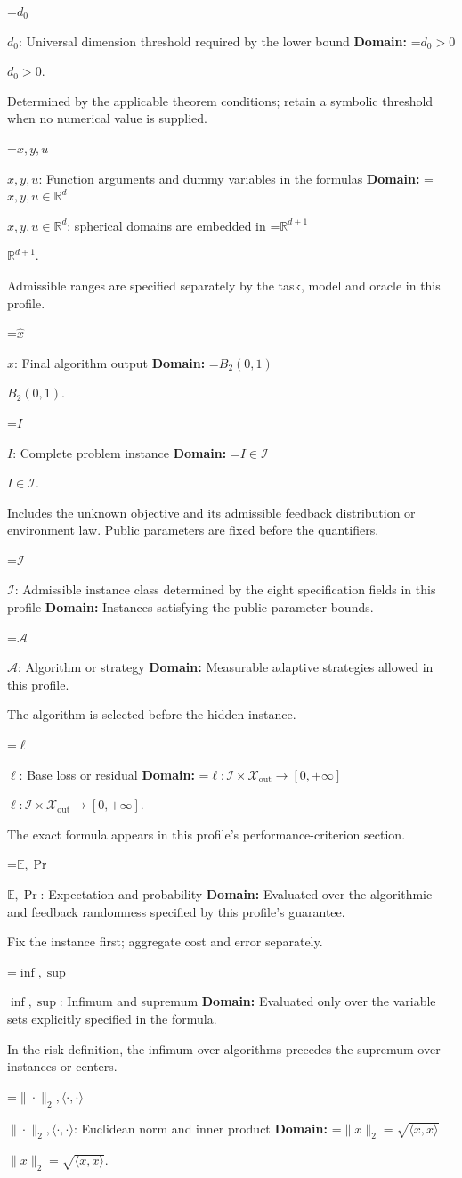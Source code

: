 \documentclass[10pt,a4paper]{article}
\newcommand{\AtlasMath}[1]{\par\begingroup\centering\setbox0=\hbox{$\displaystyle #1$}\ifdim\wd0>1.4\linewidth\typeout{ATLAS WIDE FORMULA: \the\wd0}\fi\ifdim\wd0>\linewidth\resizebox{\linewidth}{!}{\box0}\else\box0\fi\par\endgroup}
\newcommand{\AtlasInlineMath}[1]{\begingroup\setbox0=\hbox{$#1$}\ifdim\wd0>.4\linewidth\endgroup\AtlasMath{#1}\else\endgroup$#1$\fi}
\begin{document}
\AtlasInlineMath{d_0}: Universal dimension threshold required by the lower bound \textbf{Domain:} \AtlasInlineMath{d_0>0}.

Determined by the applicable theorem conditions; retain a symbolic threshold when no numerical value is supplied.

\AtlasInlineMath{x,y,u}: Function arguments and dummy variables in the formulas \textbf{Domain:} \AtlasInlineMath{x,y,u\in\mathbb{R}^d}; spherical domains are embedded in \AtlasInlineMath{\mathbb{R}^{d+1}}.

Admissible ranges are specified separately by the task, model and oracle in this profile.

\AtlasInlineMath{\widehat{x}}: Final algorithm output \textbf{Domain:} \AtlasInlineMath{B_2(0,1)}.

\AtlasInlineMath{I}: Complete problem instance \textbf{Domain:} \AtlasInlineMath{I\in\mathcal{I}}.

Includes the unknown objective and its admissible feedback distribution or environment law. Public parameters are fixed before the quantifiers.

\AtlasInlineMath{\mathcal{I}}: Admissible instance class determined by the eight specification fields in this profile \textbf{Domain:} Instances satisfying the public parameter bounds.

\AtlasInlineMath{\mathcal{A}}: Algorithm or strategy \textbf{Domain:} Measurable adaptive strategies allowed in this profile.

The algorithm is selected before the hidden instance.

\AtlasInlineMath{\ell}: Base loss or residual \textbf{Domain:} \AtlasInlineMath{\ell:\mathcal{I}\times\mathcal{X}_{\mathrm{out}}\to[0,+\infty]}.

The exact formula appears in this profile's performance-criterion section.

\AtlasInlineMath{\mathbb{E},\Pr}: Expectation and probability \textbf{Domain:} Evaluated over the algorithmic and feedback randomness specified by this profile's guarantee.

Fix the instance first; aggregate cost and error separately.

\AtlasInlineMath{\inf,\sup}: Infimum and supremum \textbf{Domain:} Evaluated only over the variable sets explicitly specified in the formula.

In the risk definition, the infimum over algorithms precedes the supremum over instances or centers.

\AtlasInlineMath{\|\cdot\|_2,\langle\cdot,\cdot\rangle}: Euclidean norm and inner product \textbf{Domain:} \AtlasInlineMath{\|x\|_2=\sqrt{\langle x,x\rangle}}.
\end{document}
